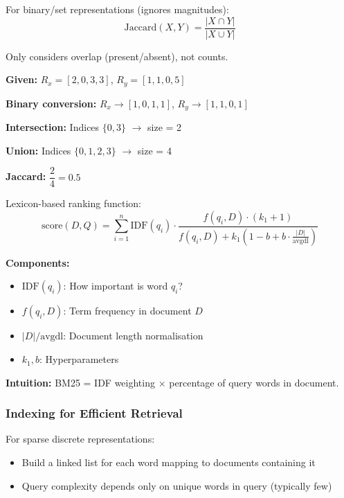 \begin{defbox}
For binary/set representations (ignores magnitudes):
\[
\text{Jaccard}(X, Y) = \frac{|X \cap Y|}{|X \cup Y|}
\]

Only considers overlap (present/absent), not counts.
\end{defbox}

\begin{exbox}
\textbf{Given:} $R_x = [2, 0, 3, 3]$, $R_y = [1, 1, 0, 5]$

\textbf{Binary conversion:} $R_x \to [1, 0, 1, 1]$, $R_y \to [1, 1, 0, 1]$

\textbf{Intersection:} Indices $\{0, 3\}$ $\to$ size = 2

\textbf{Union:} Indices $\{0, 1, 2, 3\}$ $\to$ size = 4

\textbf{Jaccard:} $\dfrac{2}{4} = \boxed{0.5}$
\end{exbox}

\begin{defbox}[BM25]
Lexicon-based ranking function:
\[
\text{score}(D, Q) = \sum_{i=1}^{n} \text{IDF}(q_i) \cdot \frac{f(q_i, D) \cdot (k_1 + 1)}{f(q_i, D) + k_1 \left(1 - b + b \cdot \frac{|D|}{\text{avgdl}}\right)}
\]

\textbf{Components:}
\begin{itemize}
  \item $\text{IDF}(q_i)$: How important is word $q_i$?
  \item $f(q_i, D)$: Term frequency in document $D$
  \item $|D| / \text{avgdl}$: Document length normalisation
  \item $k_1, b$: Hyperparameters
\end{itemize}

\textbf{Intuition:} BM25 = IDF weighting $\times$ percentage of query words in document.
\end{defbox}

\bigseparator

\subsubsection{Indexing for Efficient Retrieval}

\begin{defbox}
For sparse discrete representations:
\begin{itemize}
  \item Build a linked list for each word mapping to documents containing it
  \item Query complexity depends only on unique words in query (typically few)
\end{itemize}
\end{defbox}

